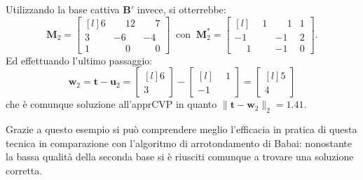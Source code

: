 \begin{exmp}
Utilizzando la base cattiva $\mathbf{B}'$ invece, si otterrebbe:
\begin{equation*}
    \mathbf{M}_2 =
    \begin{bmatrix*}[l]
        6 & \phantom{-}12 & \phantom{-}7\\
        3 & -6           & -4\\
        1 & \phantom{-}0 & \phantom{-}0
    \end{bmatrix*}
    \ \text{ con } \
    \mathbf{M}_2^* =
    \begin{bmatrix*}[l]
        \phantom{-}1 & \phantom{-}1 & 1\\
        -1           & -1           & 2\\
        \phantom{-}1 & -1           & 0
    \end{bmatrix*}.
\end{equation*}
Ed effettuando l'ultimo passaggio:
\begin{equation*}
    \mathbf{w}_2 = \mathbf{t} - \mathbf{u}_2 =
    \begin{bmatrix*}[l]
        6 \\
        3
    \end{bmatrix*}
    -
    \begin{bmatrix*}[l]
        \phantom{-}1 \\
        -1
    \end{bmatrix*}
    =
    \begin{bmatrix*}[l]
        5 \\
        4
    \end{bmatrix*}
\end{equation*}
che è comunque soluzione all'apprCVP in quanto $\|\mathbf{t}-\mathbf{w}_2\|_2=1.41$.
\end{exmp}
Grazie a questo esempio si può comprendere meglio l'efficacia in pratica di questa tecnica
in comparazione con l'algoritmo di arrotondamento di Babai: nonostante la bassa qualità
della seconda base si è riusciti comunque a trovare una soluzione corretta.


